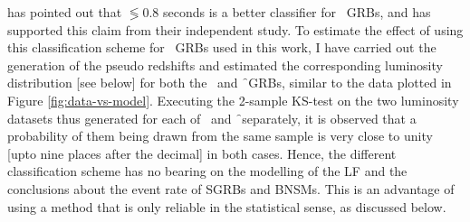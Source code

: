 \cite{Bromberg_et_al.-2013-ApJ} has pointed out that $\lessgtr 0.8$ seconds is a better classifier for \s\ GRBs, and \cite{Wanderman_and_Piran-2015-MNRAS} has supported this claim from their independent study. To estimate the effect of using this classification scheme for \s\ GRBs used in this work, I have carried out the generation of the pseudo redshifts and estimated the corresponding luminosity distribution [see below] for both the \s\ and \f\ GRBs, similar to the data plotted in Figure \ref{fig:data-vs-model}. Executing the 2-sample KS-test on the two luminosity datasets thus generated for each of \s\ and \f\ separately, it is observed that a probability of them being drawn from the same sample is very close to unity [upto nine places after the decimal] in both cases. Hence, the different classification scheme has no bearing on the modelling of the LF and the conclusions about the event rate of SGRBs and BNSMs. This is an advantage of using a method that is only reliable in the statistical sense, as discussed below.


